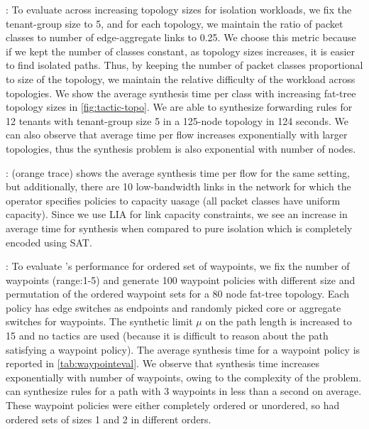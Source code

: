 :
 To evaluate \Name across increasing topology sizes for isolation workloads, 
we fix the tenant-group size to 5, and for each topology, we maintain
 the ratio of packet classes to number of edge-aggregate links to 0.25. 
We choose this metric because if we kept the number of classes constant,
as topology sizes increases, it is easier to find isolated paths. Thus, by keeping
the number of packet classes proportional to size of the topology, we maintain
the relative difficulty of the workload across topologies. 
We show the average synthesis time per class with
 increasing fat-tree topology sizes in \cref{fig:tactic-topo}. 
 We are able to synthesize forwarding rules for 
 12 tenants with tenant-group size 5 in a 125-node topology in 124 seconds. 
  We can also observe that average time per flow increases exponentially 
  with larger topologies, 
  thus the synthesis problem is also exponential with number of nodes.
  
  
 : 
 (orange trace) shows the average synthesis time per flow for the same setting, but
 additionally, there are 10 low-bandwidth links in the network for which the operator
 specifies policies to capacity uasage (all packet classes have uniform capacity). 
Since we use LIA for link capacity constraints, we see an 
increase in average time for synthesis 
when compared to pure isolation which is completely 
encoded using SAT. 

: 
To evaluate \Name's performance for ordered set of 
waypoints, we fix the 
number of waypoints (range:1-5) and generate 100 waypoint
policies with different size and permutation of the ordered waypoint 
sets for a 80 node fat-tree topology. Each policy has edge switches as endpoints 
and randomly picked core or aggregate switches for waypoints. The 
synthetic limit $\mu$ on the path length is increased to 15 and no tactics
are used (because it is difficult to reason about the path satisfying a waypoint
policy). The average 
synthesis time for a waypoint policy is reported in \cref{tab:waypointeval}. 
We observe that synthesis time increases exponentially with number of waypoints,
owing to the complexity of the problem. 
\Name can synthesize rules for a path with 3 waypoints in less than a
second on average. These waypoint policies were either completely
ordered or unordered, so had ordered sets of sizes 1 and 2 in different
orders. 

